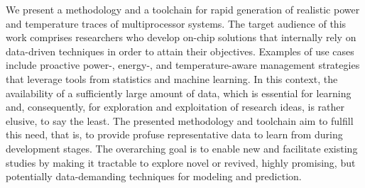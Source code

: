 We present a methodology and a toolchain for rapid generation of realistic power
and temperature traces of multiprocessor systems. The target audience of this
work comprises researchers who develop on-chip solutions that internally rely on
data-driven techniques in order to attain their objectives. Examples of use
cases include proactive power-, \mbox{energy-,} and temperature-aware management
strategies that leverage tools from statistics and machine learning. In this
context, the availability of a sufficiently large amount of data, which is
essential for learning and, consequently, for exploration and exploitation of
research ideas, is rather elusive, to say the least. The presented methodology
and toolchain aim to fulfill this need, that is, to provide profuse
representative data to learn from during development stages. The overarching
goal is to enable new and facilitate existing studies by making it tractable to
explore novel or revived, highly promising, but potentially data-demanding
techniques for modeling and prediction.
